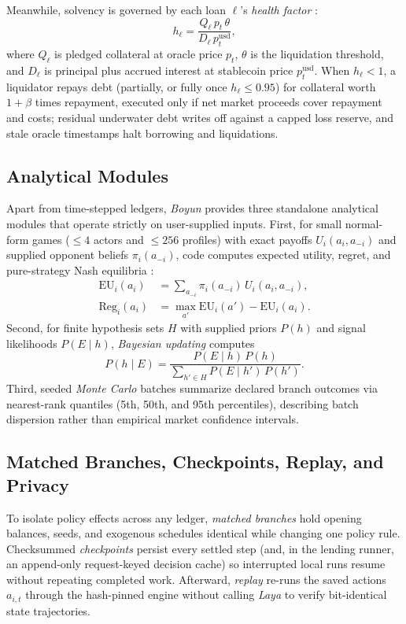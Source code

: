 Meanwhile, solvency is governed by each loan $\ell$'s \textit{health
factor} \cite{aaveliquidations}:
\begin{equation}
h_\ell=\frac{Q_\ell\,p_t\,\theta}{D_\ell\,p^{\mathrm{usd}}_t},
\label{eq:health}
\end{equation}
where $Q_\ell$ is pledged collateral at oracle price $p_t$, $\theta$ is the
liquidation threshold, and $D_\ell$ is principal plus accrued interest at
stablecoin price $p_t^{\mathrm{usd}}$. When $h_\ell<1$, a liquidator repays
debt (partially, or fully once $h_\ell\le 0.95$) for collateral worth $1+\beta$
times repayment, executed only if net market proceeds cover repayment and costs;
residual underwater debt writes off against a capped loss reserve, and stale
oracle timestamps halt borrowing and liquidations.

\subsection{Analytical Modules}\label{sec:analysis}
Apart from time-stepped ledgers, \textit{Boyun} provides three standalone
analytical modules that operate strictly on user-supplied inputs. First, for
small normal-form games ($\le 4$ actors and $\le 256$ profiles) with exact
payoffs $U_i(a_i,a_{-i})$ and supplied opponent beliefs $\pi_i(a_{-i})$,
code computes expected utility, regret, and pure-strategy Nash equilibria
\cite{nash1950}:
\begin{align}
\mathrm{EU}_i(a_i)&=\textstyle\sum_{a_{-i}}\pi_i(a_{-i})\,U_i(a_i,a_{-i}),\label{eq:eu}\\
\mathrm{Reg}_i(a_i)&=\textstyle\max_{a'}\mathrm{EU}_i(a')-\mathrm{EU}_i(a_i).\label{eq:regret}
\end{align}
Second, for finite hypothesis sets $H$ with supplied priors $P(h)$ and signal
likelihoods $P(E\mid h)$, \textit{Bayesian updating} computes
\cite{pishronik2014}
\begin{equation}
P(h\mid E)=\frac{P(E\mid h)\,P(h)}{\sum_{h'\in H}P(E\mid h')\,P(h')}.
\label{eq:bayes}
\end{equation}
Third, seeded \textit{Monte Carlo} batches summarize declared branch outcomes
via nearest-rank quantiles (5th, 50th, and 95th percentiles), describing batch
dispersion rather than empirical market confidence intervals.

\subsection{Matched Branches, Checkpoints, Replay, and Privacy}\label{sec:boundaries}
To isolate policy effects across any ledger, \textit{matched branches}
hold opening balances, seeds, and exogenous schedules identical while changing
one policy rule. Checksummed \textit{checkpoints} persist every settled step
(and, in the lending runner, an append-only request-keyed decision cache) so
interrupted local runs resume without repeating completed work. Afterward,
\textit{replay} re-runs the saved actions $a_{i,t}$ through the hash-pinned
engine without calling \textit{Laya} to verify bit-identical state trajectories.

